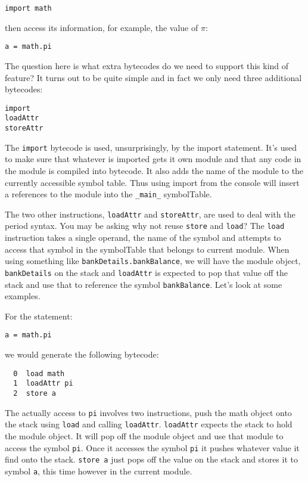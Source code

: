 \begin{lstlisting}
import math
\end{lstlisting}

then access its information, for example, the value of $\pi$:

\begin{lstlisting}
a = math.pi
\end{lstlisting}

The question here is what extra bytecodes do we need to support this kind of feature? It turns out to be quite simple and in fact we only need three additional bytecodes:

\begin{lstlisting}
import
loadAttr
storeAttr
\end{lstlisting}

The {\tt import} bytecode is used, unsurprisingly, by the import statement. It's used to make sure that whatever is imported gets it own module and that any code in the module is compiled into bytecode. It also adds the name of the module to the currently accessible symbol table. Thus using import from the console will insert a references to the module into the {\tt _main_} symbolTable.

The two other instructions, {\tt loadAttr} and {\tt storeAttr}, are used to deal with the period syntax. You may be asking why not reuse {\tt store} and {\tt load}? The {\tt load} instruction takes a single operand, the name of the symbol and attempts to access that symbol in the symbolTable that belongs to current module. When using something like {\tt bankDetails.bankBalance}, we will have the module object, {\tt bankDetails} on the stack and {\tt loadAttr} is expected to pop that value off the stack and use that to reference the symbol {\tt bankBalance}. Let's look at some examples.

For the statement:

\begin{lstlisting}
a = math.pi
\end{lstlisting}

we would generate the following bytecode:

\begin{lstlisting}
  0  load math
  1  loadAttr pi
  2  store a
\end{lstlisting}

The actually access to {\tt pi} involves two instructions, push the math object onto the stack using {\tt load} and calling {\tt loadAttr}. {\tt loadAttr} expects the stack to hold the module object. It will pop off the module object and use that module to access the symbol {\tt pi}. Once it accesses the symbol {\tt pi} it pushes whatever value it find onto the stack. {\tt store a} just pops off the value on the stack and stores it to symbol {\tt a}, this time however in the current module.

